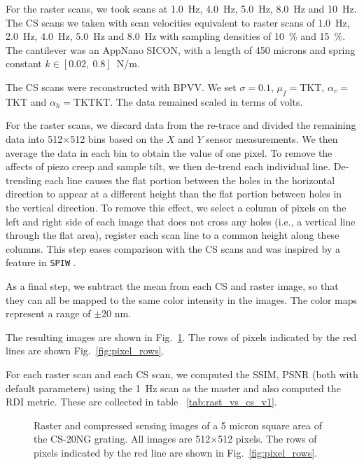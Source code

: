 \documentclass[twocolumn,oneside]{IEEEtran/IEEEtran}
\newcommand{\xc}{\ensuremath{X}\xspace}
\newcommand{\yc}{\ensuremath{Y}\xspace}
\begin{document}

For the raster scans, we took scans at 1.0~Hz, 4.0~Hz, 5.0~Hz, 8.0~Hz and
10~Hz.  The CS scans we taken with scan velocities equivalent to raster scans of 1.0~Hz,
2.0~Hz, 4.0~Hz, 5.0~Hz and 8.0~Hz with sampling densities of 10~\% and 15~\%.
The cantilever was an AppNano SICON, with a
length of 450 microns and spring constant $k\in[0.02,~0.8]$~N/m.

The CS scans were reconstructed with BPVV. We set
$\sigma = 0.1$, $\mu_f=$TKT, $\alpha_v=$TKT and $\alpha_h=$TKTKT. The data remained scaled in terms of volts.

For the raster scans, we discard data from the re-trace and divided the
remaining data into 512$\times$512 bins based on the \xc and \yc sensor
measurements. We then average the data in each bin to obtain the value of one
pixel. To remove the affects of piezo creep and sample tilt, we then de-trend
each individual line. De-trending each line causes the flat portion between the holes in the horizontal direction to appear at a different height than the flat portion between holes in the vertical direction. 
To remove this effect, we select a column of
pixels on the left and right side of each image that does not cross any holes
(i.e., a vertical line through the flat area), register each scan line to a
common height along these columns. This step eases comparison with the CS scans
and was inspired by a feature in \texttt{SPIW} \cite{spiw}.

As a final step, we subtract the mean from each CS and raster image, so that
they can all be mapped to the same color intensity in the images. The color maps
represent a range of $\pm$20 nm.


The resulting images are shown in Fig.~\ref{fig:resultsF1_images}. The rows of
pixels indicated by the red lines are shown Fig.~\ref{fig:pixel_rows}.


For each raster scan and each CS scan, we computed the SSIM, PSNR (both with
default parameters) using the 1~Hz scan as the master and also computed the RDI
metric. These are collected in table ~\ref{tab:rast_vs_cs_v1}.

\begin{figure}
  
  \caption{Raster and compressed sensing images of a 5 micron square area of the
    CS-20NG grating. All images are 512$\times$512 pixels. The rows of pixels
    indicated by the red line are shown in Fig.~\ref{fig:pixel_rows}.}
  \label{fig:resultsF1_images}
\end{figure}
\end{document}
